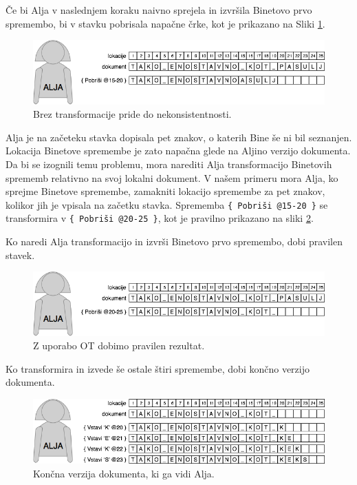 \documentclass[a4paper, 12pt, twoside]{book}
\begin{document}
Če bi Alja v naslednjem koraku naivno sprejela in izvršila Binetovo prvo spremembo, bi v stavku pobrisala napačne črke, kot je prikazano na Sliki \ref{ot3}.

\begin{figure}[placement h]
\begin{center}
\includegraphics[width=12cm]{ot3.png}
\end{center}
\caption{Brez transformacije pride do nekonsistentnosti.}
\label{ot3}
\end{figure}

Alja je na začeteku stavka dopisala pet znakov, o katerih Bine še ni bil seznanjen. Lokacija Binetove spremembe je zato napačna glede na Aljino verzijo dokumenta. Da bi se izognili temu problemu, mora narediti Alja transformacijo Binetovih sprememb relativno na svoj lokalni dokument. V našem primeru mora Alja, ko sprejme Binetove spremembe, zamakniti lokacijo spremembe za pet znakov, kolikor jih je vpisala na začetku stavka. Sprememba {\tt \{ Pobriši @15-20 \}} se transformira v {\tt \{ Pobriši @20-25 \}}, kot je pravilno prikazano na sliki \ref{ot4}.

\pagebreak

Ko naredi Alja transformacijo in izvrši Binetovo prvo spremembo, dobi pravilen stavek.

\begin{figure}[placement h]
\begin{center}
\includegraphics[width=12cm]{ot4.png}
\end{center}
\caption{Z uporabo OT dobimo pravilen rezultat.}
\label{ot4}
\end{figure}

Ko transformira in izvede še ostale štiri spremembe, dobi končno verzijo dokumenta.

\begin{figure}[placement h]
\begin{center}
\includegraphics[width=12cm]{ot5.png}
\end{center}
\caption{Končna verzija dokumenta, ki ga vidi Alja.}
\label{ot5}
\end{figure}
\end{document}
